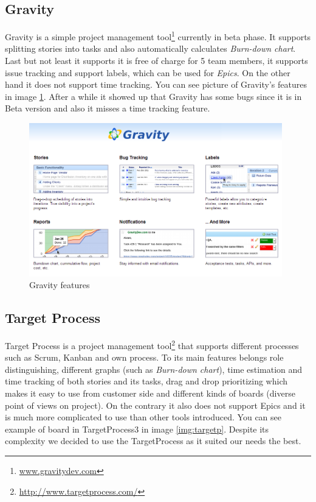 
\subsection{Gravity} 
Gravity is a simple project management tool\footnote{\url{www.gravitydev.com}} currently in beta phase.
It supports splitting stories into tasks and also automatically calculates \emph{Burn-down chart}. 
Last but not least it supports it is free of charge for 5 team members, it supports issue tracking and support labels, which can be used for \emph{Epics}.
On the other hand it does not support time tracking.
You can see picture of Gravity's features in image \ref{img:gravity}. After a while it showed up that Gravity has some bugs since it is in Beta version and also it misses a time tracking feature.

\begin{figure}[!h]
	\centering
		\includegraphics[width=11cm]{preliminaryStudies/gravity.png}
	\caption{Gravity features}
	\label{img:gravity}
\end{figure}

\subsection{Target Process} 
\label{targetProcessToolDescription}
Target Process is a project management tool\footnote{\url{http://www.targetprocess.com/}} that supports different processes such as Scrum, Kanban and own process. 
To its main features belongs role distinguishing, different graphs (such as \emph{Burn-down chart}), time estimation and time tracking of both stories and its tasks, drag and drop prioritizing which makes it easy to use from customer side and different kinds of boards (diverse point of views on project).
On the contrary it also does not support Epics and it is much more complicated to use than other tools introduced.
You can see example of board in TargetProcess3 in image \ref{img:targetp}. Despite its complexity we decided to use the TargetProcess as it suited our needs the best.

